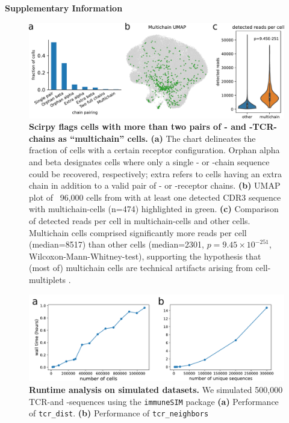 \documentclass{article}
\begin{document}
\begin{center}
    \normalfont\Large\bfseries{Supplementary Information}
\end{center}
\vspace*{60pt}

\begin{figure}[!hb]
  \centering
  \includegraphics[width=7in]{../figures/multichains.pdf}
  \caption{
    \textbf{Scirpy flags cells with more than two pairs of \textalpha- and \textbeta-TCR-chains as “multichain” cells.} 
    \textbf{(a)} The chart delineates the fraction of
    cells with a certain receptor configuration. Orphan alpha and beta designates cells 
    where only a single \textalpha- or \textbeta-chain sequence could be recovered, 
    respectively; extra refers to cells having an extra chain in addition to a valid pair of
    \textalpha- or \textbeta-receptor chains. 
    \textbf{(b)} UMAP plot of ~96,000 cells from \textcite{Wu2020-vp} with at
    least one detected CDR3 sequence with multichain-cells (n=474) highlighted in green.
    \textbf{(c)} Comparison of detected reads per cell in multichain-cells and other cells.
    Multichain cells comprised significantly more reads per cell (median=8517) than other cells (median=2301, $p=9.45 \times 10^{-251}$, Wilcoxon-Mann-Whitney-test), supporting the hypothesis 
    that (most of) multichain cells are technical artifacts arising from 
    cell-multiplets \cite{Ilicic2016-ny}. }
\end{figure}


\newpage
\begin{figure}[!ht]
  \centering
  \includegraphics[width=7in]{../figures/runtime.pdf}
  \caption{\textbf{Runtime analysis on simulated datasets.} We simulated 500,000 TCR-\textalpha and -\textbeta sequences using the \texttt{immuneSIM} package \textbf{(a)} Performance of \texttt{tcr\_dist}. \textbf{(b)} Performance of \texttt{tcr\_neighbors}}
\end{figure}
\end{document}
